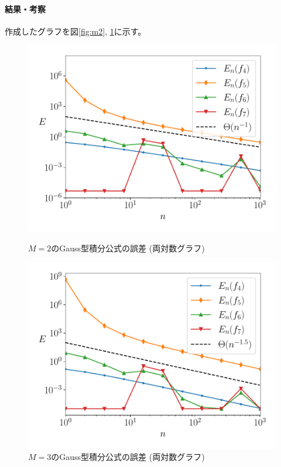 \documentclass[a4j, titlepage]{jsarticle}
\numberwithin{equation}{section}
\begin{document}
            \paragraph{結果・考察}
                作成したグラフを図\ref{fig:m2}, \ref{fig:m3}に示す。
                \begin{figure}[h]
                    \begin{minipage}{0.49\hsize}
                        \centering
                        \includegraphics[width=1\hsize]{kadai3/1/2.pdf}
                        \caption{$M=2$のGauss型積分公式の誤差 (両対数グラフ)}
                        \label{fig:m2}
                    \end{minipage}
                    \begin{minipage}{0.49\hsize}
                        \centering
                        \includegraphics[width=1\hsize]{kadai3/1/3.pdf}
                        \caption{$M=3$のGauss型積分公式の誤差 (両対数グラフ)}
                        \label{fig:m3}
                    \end{minipage}
                \end{figure}
\end{document}
